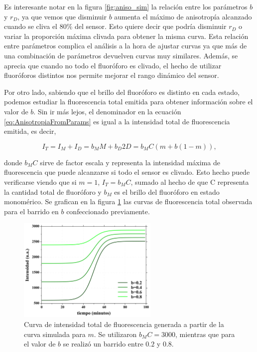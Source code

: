 Es interesante notar en la figura \ref{fig:aniso_sim} la relación entre los parámetros $b$ y $r_D$, ya que vemos que disminuir $b$ aumenta el máximo de anisotropía alcanzado cuando se cliva el $80\%$ del sensor. Esto quiere decir que podría disminuir $r_D$ o variar la proporción máxima clivada para obtener la misma curva. Esta relación entre parámetros complica el análisis a la hora de ajustar curvas ya que más de una combinación de parámetros devuelven curvas muy similares. Además, se aprecia que cuando no todo el fluoróforo es clivado, el hecho de utilizar fluoróforos distintos nos permite mejorar el rango dinámico del sensor.

Por otro lado, sabiendo que el brillo del fluoróforo es distinto en cada estado, podemos estudiar la fluorescencia total emitida para obtener información sobre el valor de $b$. Sin ir más lejos, el denominador en la ecuación \ref{eq:AnisotropiaFromParams} es igual a la intensidad total de fluorescencia emitida, es decir,

\begin{equation}
    I_T = I_M+I_D = b_M M+b_D 2D = b_M C (m+b (1-m)), \label{eq:Int_fromFit}
\end{equation}

\noindent donde $b_M C$ sirve de factor escala y representa la intensidad máxima de fluorescencia que puede alcanzarse si todo el sensor es clivado. Esto hecho puede verificarse viendo que si $m=1$, $I_T=b_M C$, sumado al hecho de que C representa la cantidad total de fluoróforo y $b_M$ es el brillo del fluoróforo en estado monomérico. Se grafican en la figura \ref{fig:f_sim} las curvas de fluorescencia total observada para el barrido en $b$ confeccionado previamente.

\begin{figure}
\centering
    \includegraphics[width=0.6\textwidth]{./img/f_sim.png}
    \caption{Curva de intensidad total de fluorescencia generada a partir de la curva simulada para $m$. Se utilizaron $b_M C = 3000$, mientras que para el valor de $b$ se realizó un barrido entre $0.2$ y $0.8$.}
    \label{fig:f_sim}
\end{figure}

